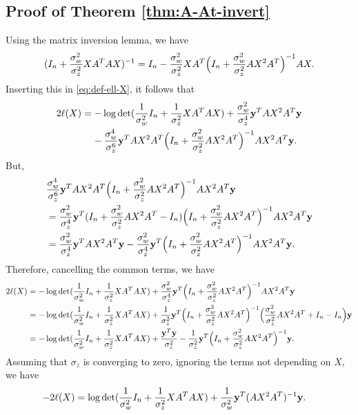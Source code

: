 \documentclass[onecolumn]{IEEEtran}
\begin{document}
\subsection{Proof of Theorem \ref{thm:A-At-invert}}\label{proof_thm:A-At-invert}
Using the matrix inversion lemma, we have 
\begin{align}
(I_n+ { \sigma_w^2 \over \sigma_z^2}XA^TAX)^{-1}= I_n-{\sigma_w^2\over \sigma_z^2}XA^T\Big(I_n+{\sigma_w^2\over \sigma_z^2}AX^2A^T\Big)^{-1}AX.
\end{align}
Inserting this in \eqref{eq:def-ell-X}, it follows that 
\begin{align}
2\ell(X)&=-\log\det({1\over \sigma_w^2}I_n+ {1\over \sigma_z^2}XA^TAX)+{\sigma_w^2\over \sigma_z^4}{\bf y}^TAX^2A^T{\bf y}\nonumber\\
&\;\;\;\;- {\sigma_w^4\over \sigma_z^6}{\bf y}^TAX^2A^T\Big(I_n+{\sigma_w^2\over \sigma_z^2}AX^2A^T\Big)^{-1}AX^2A^T{\bf y}.
\end{align}
But,
\begin{align}
& {\sigma_w^4\over \sigma_z^6}{\bf y}^TAX^2A^T\Big(I_n+{\sigma_w^2\over \sigma_z^2}AX^2A^T\Big)^{-1}AX^2A^T{\bf y}\nonumber\\
& = {\sigma_w^2\over \sigma_z^4}{\bf y}^T(I_n+{\sigma_w^2\over \sigma_z^2}AX^2A^T-I_n)\Big(I_n+{\sigma_w^2\over \sigma_z^2}AX^2A^T\Big)^{-1}AX^2A^T{\bf y}\nonumber\\
  &={\sigma_w^2\over \sigma_z^4}{\bf y}^TAX^2A^T{\bf y}-{\sigma_w^2\over \sigma_z^4}{\bf y}^T\Big(I_n+{\sigma_w^2\over \sigma_z^2}AX^2A^T\Big)^{-1}AX^2A^T{\bf y}.
\end{align}
Therefore, cancelling the common terms, we have
\begin{align}
2\ell(X)&=-\log\det({1\over \sigma_w^2}I_n+ {1\over \sigma_z^2}XA^TAX)+{\sigma_w^2\over \sigma_z^4}{\bf y}^T\Big(I_n+{\sigma_w^2\over \sigma_z^2}AX^2A^T\Big)^{-1}AX^2A^T{\bf y}\nonumber\\
&=-\log\det({1\over \sigma_w^2}I_n+ {1\over \sigma_z^2}XA^TAX)+{1\over \sigma_z^2}{\bf y}^T\Big(I_n+{\sigma_w^2\over \sigma_z^2}AX^2A^T\Big)^{-1}\Big({\sigma_w^2\over \sigma_z^2}AX^2A^T+I_n-I_n\Big){\bf y}\nonumber\\
&=-\log\det({1\over \sigma_w^2}I_n+ {1\over \sigma_z^2}XA^TAX)+ {{\bf y}^T{\bf y}\over \sigma_z^2}-{1\over \sigma_z^2}{\bf y}^T\Big(I_n+{\sigma_w^2\over \sigma_z^2}AX^2A^T\Big)^{-1}{\bf y}.
\end{align}
Assuming that $\sigma_z$ is converging to zero, ignoring the terms not depending on $X$, we have 
\begin{align}
-2\ell(X)&=\log\det({1\over \sigma_w^2}I_n+ {1\over \sigma_z^2}XA^TAX)+{1\over \sigma_w^2}{\bf y}^T(AX^2A^T)^{-1}{\bf y}.
\end{align}
\end{document}
